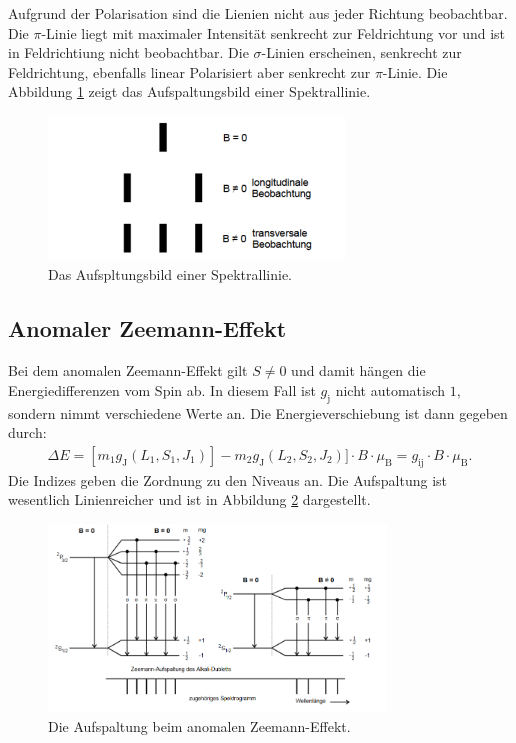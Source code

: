 Aufgrund der Polarisation sind die Lienien nicht aus jeder Richtung beobachtbar.
Die $\pi$-Linie liegt mit maximaler Intensität senkrecht zur Feldrichtung vor und ist in Feldrichtiung nicht beobachtbar.
Die $\sigma$-Linien erscheinen, senkrecht zur Feldrichtung, ebenfalls linear Polarisiert aber senkrecht zur $\pi$-Linie.
Die Abbildung \ref{fig:aufspaltungsbild} zeigt das Aufspaltungsbild einer Spektrallinie.
\begin{figure}
   \centering
    \includegraphics[width=0.7\textwidth]{aufspaltungsbild.PNG}
    \caption{Das Aufspltungsbild einer Spektrallinie.\cite{skript}}
    \label{fig:aufspaltungsbild}
\end{figure}
\subsection{Anomaler Zeemann-Effekt}
Bei dem anomalen Zeemann-Effekt gilt $S \neq 0$ und damit hängen die Energiedifferenzen vom Spin ab.
In diesem Fall ist $g_\mathrm{j}$ nicht automatisch $1$, sondern nimmt verschiedene Werte an.
Die Energieverschiebung ist dann gegeben durch:
\begin{align}
  \Delta E= [m_\mathrm{1}g_\mathrm{J}(L_\mathrm{1},S_\mathrm{1},J_\mathrm{1})]-m_\mathrm{2}g_\mathrm{J}(L_\mathrm{2},S_\mathrm{2},J_\mathrm{2})]\cdot B \cdot \mu_\mathrm{B}=g_\mathrm{ij}\cdot B \cdot \mu_\mathrm{B} \label{eqn:g_ji}.
\end{align}
Die Indizes geben die Zordnung zu den Niveaus an.
Die Aufspaltung ist wesentlich Linienreicher und ist in Abbildung \ref{fig:anomal} dargestellt.
\begin{figure}
   \centering
    \includegraphics[width=0.8\textwidth]{anomal.PNG}
    \caption{Die Aufspaltung beim anomalen Zeemann-Effekt.\cite{skript}}
    \label{fig:anomal}
\end{figure}
